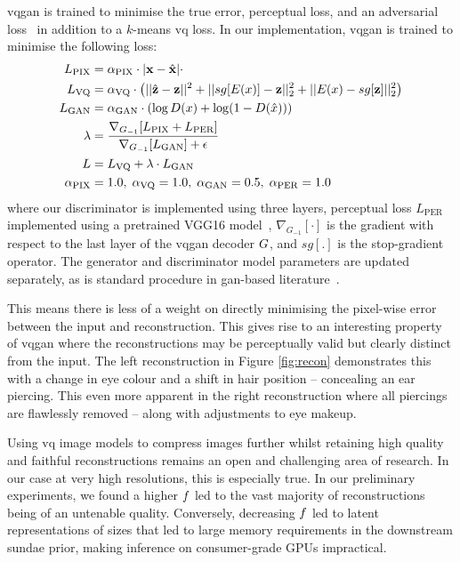 \Gls{vqgan} is trained to minimise the true error, perceptual loss, and an
adversarial loss~\cite{esser2021taming} in addition to a $k$-means \gls{vq}
loss. In our implementation, \gls{vqgan} is trained to minimise the following
loss:
\begin{align}
\begin{split}
    L_\text{PIX} &= \alpha_\text{PIX} \cdot |\mathbf{x} - \hat{\mathbf{x}}| \cdot \\
    L_\text{VQ} &= \alpha_\text{VQ} \cdot \left(||\hat{\mathbf{z}} -
    \mathbf{z}||^2 + ||sg[E(x)] - \mathbf{z}||^2_2 + ||E(x) -
    sg[\mathbf{z}]||^2_2\right)\\
    L_\text{GAN} &= \alpha_\text{GAN} \cdot \left(\log D(x) + \log
    (1-D(\hat{x}))\right) \\
    \lambda &= \frac{\nabla_{G_{-1}}[L_\text{PIX} +
    L_\text{PER}]}{\nabla_{G_{-1}}[L_\text{GAN}] + \epsilon}\\
    L &= L_\text{VQ} + \lambda \cdot L_\text{GAN}\\
    \alpha_\text{PIX} &= 1.0,\; \alpha_\text{VQ} = 1.0,\; \alpha_\text{GAN} = 0.5,\; \alpha_\text{PER} = 1.0
\end{split}
\end{align}
\cite{esser2021taming} where our discriminator is implemented using three
layers, perceptual loss $L_\text{PER}$ implemented using a pretrained VGG16
model~\cite{karen2014vg18}, $\nabla_{G_{-1}}[\cdot]$ is the gradient with
respect to the last layer of the \gls{vqgan} decoder $G$, and
$sg[.]$ is the stop-gradient operator. The
generator and discriminator model parameters are updated separately, as is
standard procedure in \gls{gan}-based literature~\cite{esser2021taming}.

This means there is less of a weight on directly minimising the pixel-wise error
between the input and reconstruction. This gives rise to an interesting property
of \gls{vqgan} where the reconstructions may be perceptually valid but clearly
distinct from the input. The left reconstruction in Figure \ref{fig:recon}
demonstrates this with a change in eye colour and a shift in hair position --
concealing an ear piercing. This even more apparent in the right reconstruction
where all piercings are flawlessly removed -- along with adjustments to eye
makeup.

Using \gls{vq} image models to compress images further whilst retaining high
quality and faithful reconstructions remains an open and challenging area of
research. In our case at very high resolutions, this is especially true. In our
preliminary experiments, we found a higher $f$ led to the vast
majority of reconstructions being of an untenable quality. Conversely, decreasing
$f$ led to latent representations of sizes that led to large
memory requirements in the downstream \gls{sundae} prior, making inference on
consumer-grade GPUs impractical.

